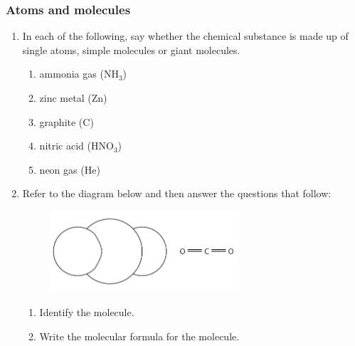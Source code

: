             \subsubsection{ Atoms and molecules         }
            \nopagebreak
            \label{m38120*id308039}\begin{enumerate}[noitemsep, label=\textbf{\arabic*}. ] 
            \label{m38120*uid11}\item In each of the following, say whether the chemical 
substance is made up of single atoms, simple molecules or giant molecules.
\label{m38120*id308055}\begin{enumerate}[noitemsep, label=\textbf{\alph*}. ] 
            \label{m38120*uid12}\item ammonia gas (${\mathrm{NH}}_{3}$)
\label{m38120*uid13}\item zinc metal ($\mathrm{Zn}$)
\label{m38120*uid14}\item graphite ($\mathrm{C}$)
\label{m38120*uid15}\item nitric acid (${\mathrm{HNO}}_{3}$)
\label{m38120*uid16}\item neon gas ($\mathrm{He}$)
\end{enumerate}
\label{m38120*uid17}\item Refer to the diagram below and then answer the 
questions that follow:
    \setcounter{subfigure}{0}
	\begin{figure}[H] %
    \begin{center}
    \label{m38120*id308155!!!underscore!!!media}\label{m38120*id308155!!!underscore!!!printimage}\includegraphics[width=7cm]{col11305.imgs/m38120_CG10C2_006.png} %
      \vspace{2pt}
    \vspace{.1in}
    \end{center}
 \end{figure}       \label{m38120*id308161}\begin{enumerate}[noitemsep, label=\textbf{\alph*}. ] 
            \label{m38120*uid18}\item Identify 
the molecule.
\label{m38120*uid19}\item Write the molecular formula for the molecule.

\end{enumerate}
\end{enumerate}
